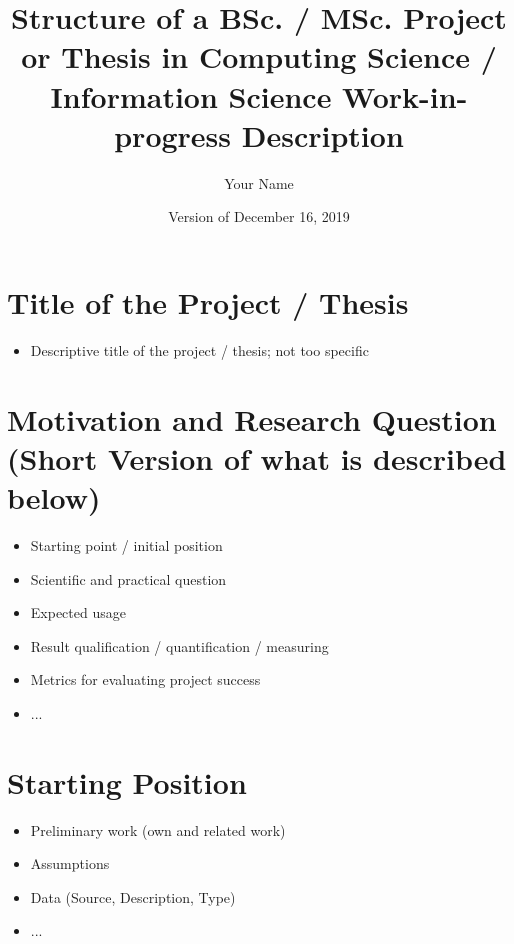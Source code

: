 \documentclass[11pt,a4paper]{article}
\begin{document}
\title{Structure of a BSc. / MSc. Project or Thesis in Computing Science / Information Science 
Work-in-progress Description}

\author{Your Name}
\date{Version of December 16, 2019}
\maketitle


\section{Title of the Project / Thesis}
\begin{itemize}
\item Descriptive title of the project / thesis; not too specific
\end{itemize}


\section{Motivation and Research Question (Short Version of what is described below)}

\begin{itemize}
\item Starting point / initial position
\item Scientific and practical question 
\item Expected usage
\item Result qualification / quantification / measuring
\item Metrics for evaluating project success
\item ...
\end{itemize}
	
\section{Starting Position}

\begin{itemize}
\item Preliminary work (own and related work)
\item Assumptions
\item Data (Source, Description, Type)
\item ...
\end{itemize}

\end{document}
